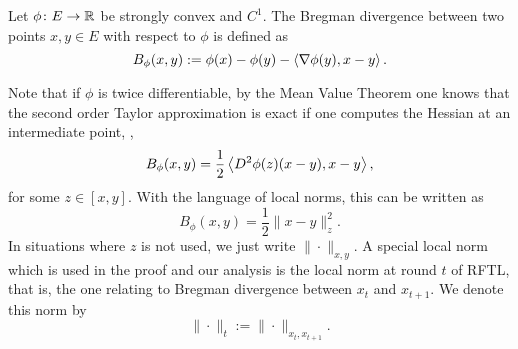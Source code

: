\begin{definition}
    Let $\phi\colon E \to \mathbb{R}$ be strongly convex and $C^1$. The Bregman divergence between two points $x,y\in E$ with respect to $\phi$ is defined as
    \[
        B_\phi(x, y) := \phi(x) - \phi(y) - \left\langle \nabla\phi(y),x-y \right\rangle.
    \]
\end{definition}

Note that if $\phi$ is twice differentiable, by the Mean Value Theorem one knows that the second order Taylor approximation is exact if one computes the Hessian at an intermediate point, \ie, 
\[
    B_\phi(x, y) = \frac{1}{2}\left\langle D^2\phi(z)(x-y), x-y \right\rangle,
\]
for some $z \in [x, y]$. With the language of local norms, this can be written as
\begin{equation}\label{eq:defnlocalnorm}
    B_\phi(x, y) = \frac{1}{2}\|x-y\|_z^2.
\end{equation}
In situations where $z$ is not used, we just write $\|\cdot\|_{x,y}$. A special local norm which is used in the proof and our analysis is the local norm at round $t$ of RFTL, that is, the one relating to Bregman divergence between $x_t$ and $x_{t+1}$. We denote this norm by
\[
    \|\cdot \|_t := \|\cdot\|_{x_t, x_{t+1}}.
\]



